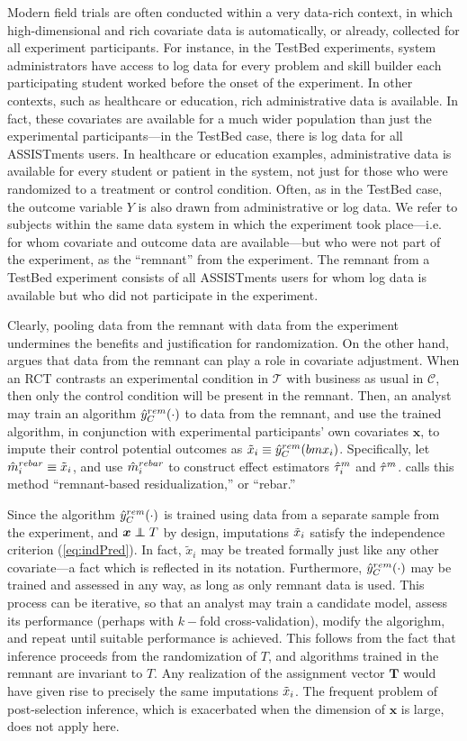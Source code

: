 Modern field trials are often conducted within a very data-rich
context, in which high-dimensional and rich covariate data is
automatically, or already, collected for all experiment participants.
For instance, in the TestBed experiments, system administrators have
access to log data for every problem and skill builder each
participating student worked before the onset of the experiment.
In other contexts, such as healthcare or education, rich
administrative data is available.
In fact, these covariates are available for a much wider population
than just the experimental participants---in the TestBed case, there
is log data for all ASSISTments users.
In healthcare or education examples, administrative data is available
for every student or patient in the system, not just for those who
were randomized to a treatment or control condition.
Often, as in the TestBed case, the outcome variable $Y$ is also drawn from administrative or
log data.
We refer to subjects within the same data system in which the
experiment took place---i.e. for whom covariate and outcome data are
available---but who were not part of the experiment, as the ``remnant'' from the experiment.
The remnant from a TestBed experiment consists of all ASSISTments
users for whom log data is available but who did not participate in
the experiment.

Clearly, pooling data from the remnant with data from the experiment
undermines the benefits and justification for randomization.
On the other hand, \citet{rebarEDM} argues that data from the remnant
can play a role in covariate adjustment.
When an RCT contrasts an experimental condition in $\mathcal{T}$ with
business as usual in $\mathcal{C}$, then only the control condition
will be present in the remnant.
Then, an analyst may train an algorithm $\hat{y}_C^{rem}(\cdot)$ to data
from the remnant, and use the trained algorithm, in conjunction with
experimental participants' own covariates $\bm{x}$, to impute their
control potential outcomes as $\tilde{x}_i\equiv \hat{y}_C^{rem}(bm{x}_i)$.
Specifically, let $\hat{m}_i^{rebar} \equiv \tilde{x}_i$, and
use $\hat{m}_i^{rebar}$ to construct effect estimators $\hat{\tau}_i^m$ and
$\hat{\tau}^m$.
\citet{rebarEDM} calls this method ``remnant-based residualization,''
or ``rebar.''

Since the algorithm $\hat{y}_C^{rem}(\cdot) $ is trained using data from a
separate sample from the experiment, and $\bm{x}\independent T$ by
design, imputations $\tilde{x}_i $ satisfy the
independence criterion (\ref{eq:indPred}).
In fact, $\tilde{x}_{i}$ may be treated formally just like any other
covariate---a fact which is reflected in its notation.
Furthermore, $\hat{y}_C^{rem}(\cdot)$ may be trained and assessed in any way, as
long as only remnant data is used.
This process can be iterative, so that an analyst may train a candidate
model, assess its performance (perhaps with $k-$fold
cross-validation), modify the algorighm, and repeat until suitable
performance is achieved.
This follows from the fact that inference proceeds from the
randomization of $T$, and algorithms trained in the remnant are invariant to
$T$.
Any realization of the assignment vector $\bm{T}$ would have given
rise to precisely the same imputations $\tilde{x}_i $.
The frequent problem of post-selection inference, which is exacerbated
when the dimension of $\bm{x}$ is large, does not apply here.

